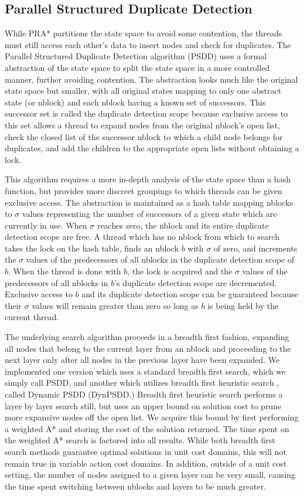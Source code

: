 \documentclass{article}
\begin{document}
\subsection{Parallel Structured Duplicate Detection}
While PRA* partitions the state space to avoid some contention, the threads must still access each other's data to insert nodes and check for duplicates. The Parallel Structured Duplicate Detection algorithm (PSDD) uses a formal abstraction of the state space to split the state space in a more controlled manner, further avoiding contention. The abstraction looks much like the original state space but smaller, with all original states mapping to only one abstract state (or nblock) and each nblock having a known set of successors. This successor set is called the duplicate detection scope because exclusive access to this set allows a thread to expand nodes from the original nblock's open list, check the closed list of the successor nblock to which a child node belongs for duplicates, and add the children to the appropriate open lists without obtaining a lock.

This algorithm requires a more in-depth analysis of the state space than a hash function, but provides more discreet groupings to which threads can be given exclusive access. The abstraction is maintained as a hash table mapping nblocks to $\sigma$ values representing the number of successors of a given state which are currently in use. When $\sigma$ reaches zero, the nblock and its entire duplicate detection scope are free. A thread which has no nblock from which to search takes the lock on the hash table, finds an nblock $b$ with $\sigma$ of zero, and increments the $\sigma$ values of the predecessors of all nblocks in the duplicate detection scope of $b$. When the thread is done with $b$, the lock is acquired and the $\sigma$ values of the predecessors of all nblocks in $b$'s duplicate detection scope are decremented. Exclusive access to $b$ and its duplicate detection scope can be guaranteed because their $\sigma$ values will remain greater than zero so long as $b$ is being held by the current thread.

The underlying search algorithm proceeds in a breadth first fashion, expanding all nodes that belong to the current layer from an nblock and proceeding to the next layer only after all nodes in the previous layer have been expanded. We implemented one version which uses a standard breadth first search, which we simply call PSDD, and another which utilizes breadth first heuristic search \cite{zhou:bhs}, called Dynamic PSDD (DynPSDD.) Breadth first heuristic search performs a layer by layer search still, but uses an upper bound on solution cost to prune more expansive nodes off the open list. We acquire this bound by first performing a weighted A* and storing the cost of the solution returned. The time spent on the weighted A* search is factored into all results. While both breadth first search methods guarantee optimal solutions in unit cost domains, this will not remain true in variable action cost domains. In addition, outside of a unit cost setting, the number of nodes assigned to a given layer can be very small, causing the time spent switching between nblocks and layers to be much greater.
\end{document}
